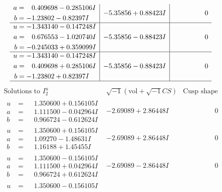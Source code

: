 \documentclass[1p]{elsarticle_modified}
\theoremstyle{definition}
\newcommand{\I}{\sqrt{-1}}
\begin{document}
$$\begin{array}{c|c|c}
\begin{aligned}
a &= \phantom{-}0.409698 - 0.285106 I \\
b &= -1.23802 - 0.82397 I\end{aligned}
 & -5.35856 + 0.88423 I & \phantom{-0.000000 } 0 \\ \hline\begin{aligned}
u &= -1.343140 - 0.147248 I \\
a &= \phantom{-}0.676553 - 1.020740 I \\
b &= -0.245033 + 0.359099 I\end{aligned}
 & -5.35856 - 0.88423 I & \phantom{-0.000000 } 0 \\ \hline\begin{aligned}
u &= -1.343140 - 0.147248 I \\
a &= \phantom{-}0.409698 + 0.285106 I \\
b &= -1.23802 + 0.82397 I\end{aligned}
 & -5.35856 - 0.88423 I & \phantom{-0.000000 } 0\\
 \hline 
 \end{array}$$\newpage$$\begin{array}{c|c|c}  
\text{Solutions to }I^u_{2}& \I (\text{vol} + \sqrt{-1}CS) & \text{Cusp shape}\\
 \hline 
\begin{aligned}
u &= \phantom{-}1.350600 + 0.156105 I \\
a &= \phantom{-}1.111500 - 0.042964 I \\
b &= \phantom{-}0.966724 - 0.612624 I\end{aligned}
 & -2.69089 + 2.86448 I & \phantom{-0.000000 } 0 \\ \hline\begin{aligned}
u &= \phantom{-}1.350600 + 0.156105 I \\
a &= \phantom{-}1.09270 - 1.48631 I \\
b &= \phantom{-}1.16188 + 1.45455 I\end{aligned}
 & -2.69089 + 2.86448 I & \phantom{-0.000000 } 0 \\ \hline\begin{aligned}
u &= \phantom{-}1.350600 - 0.156105 I \\
a &= \phantom{-}1.111500 + 0.042964 I \\
b &= \phantom{-}0.966724 + 0.612624 I\end{aligned}
 & -2.69089 - 2.86448 I & \phantom{-0.000000 } 0 \\ \hline\begin{aligned}
u &= \phantom{-}1.350600 - 0.156105 I \\

\end{aligned}
\end{array}$$
\end{document}
